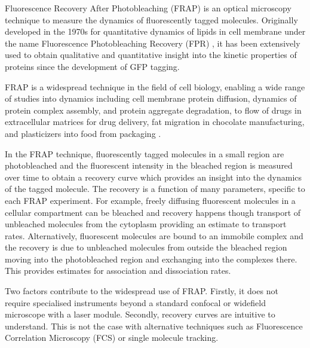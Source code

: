     Fluorescence Recovery After Photobleaching (FRAP) is an optical
    microscopy technique to measure the dynamics of fluorescently
    tagged molecules.
    Originally developed in the 1970s for quantitative dynamics of lipids
    in cell membrane under the name Fluorescence Photobleaching
    Recovery (FPR) \citep{axelrod1976mobility}, it has
    been extensively used to obtain qualitative and quantitative
    insight into the kinetic properties of proteins since the
    development of GFP tagging.

    FRAP is a widespread technique in the field of cell biology,
    enabling a wide range of studies into dynamics
    including cell membrane protein diffusion, dynamics of
    protein complex assembly, and protein aggregate degradation, to
    flow of drugs in extracellular matrices for drug delivery, fat
    migration in chocolate manufacturing, and plasticizers into food
    from packaging
    \citep{frap-review-2005,mcnally-frap-2010,frap-review-2015}.

    In the FRAP technique, fluorescently tagged molecules in a small region
    are photobleached and the fluorescent intensity in the bleached region is
    measured over time to obtain a recovery curve which provides an
    insight into the dynamics of the tagged molecule.  The recovery is a
    function of many parameters, specific to each FRAP experiment.
    For example, freely diffusing fluorescent molecules in a cellular
    compartment can be bleached and recovery happens though transport
    of unbleached molecules from the cytoplasm providing an estimate
    to transport rates.
    Alternatively, fluorescent molecules are bound to an immobile
    complex and the recovery is due to unbleached molecules from
    outside the bleached region moving into the photobleached region
    and exchanging into the complexes there.  This provides estimates for
    association and dissociation rates.

    Two factors contribute to the widespread use of FRAP.
    Firstly, it does not require specialised instruments beyond
    a standard confocal or widefield microscope with a laser
    module.
    Secondly, recovery curves are intuitive to understand.
    This is not the case with alternative techniques
    such as Fluorescence Correlation Microscopy (FCS) or single molecule
    tracking.

